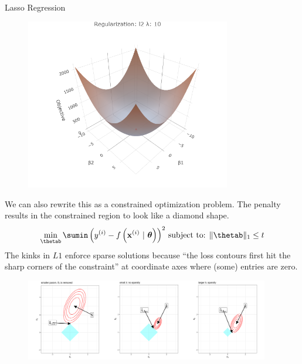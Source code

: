 \documentclass[11pt,compress,t,notes=noshow, xcolor=table]{beamer}
\begin{document}
\begin{vbframe}{Lasso Regression}
\begin{figure}
\begin{minipage}{0.32\linewidth}
        \centerline{\includegraphics[width=0.8\textwidth]{figure/reg_surfaces_l2_lam10.png}}
   \end{minipage}
\end{figure}

\framebreak

We can also rewrite this as a constrained optimization problem. The penalty results in the constrained region to look like a diamond shape.
\vspace{-0.2cm}
\begin{eqnarray*}
\min_{\thetab} \sumin \left(\yi - \fxit\right)^2\,
\text{subject to: } \|\thetab\|_1 \leq t
\end{eqnarray*}
The kinks in $L1$ enforce sparse solutions because ``the loss contours first hit the sharp corners of the constraint'' at coordinate axes where (some) entries are zero. 
\vspace{-0.1cm}
\begin{figure}%
\includegraphics[width=0.95\textwidth]
{figure/lasso_contour_cases.png}\\
\end{figure}

\end{vbframe}
\end{document}
